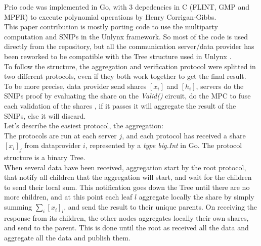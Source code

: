 \documentclass{article}
\begin{document}
Prio code \cite{priocode} was implemented in Go, with 3 depedencies in C (FLINT, GMP and MPFR) to execute polynomial operations by Henry Corrigan-Gibbs.\\
This paper contribution is mostly porting code to use the multiparty computation and SNIPs in the Unlynx framework. So most of the code is used directly from the repository, but all the communication server/data provider has been reworked to be compatible with the Tree structure used in Unlynx \cite{unlynxcode}.\\
To follow the structure, the aggregation and verification protocol were splitted in two different protocols, even if they both work together to get the final result.\\
To be more precise, data provider send shares $[x_i]$ and $[h_i]$, servers do the SNIPs proof by evaluating the share on the \textit{Valid()} circuit, do the MPC to fuse each validation of the shares , if it passes it will aggregate the result of the SNIPs, else it will discard.\\
Let's describe the easiest protocol, the aggregation:\\
The protocols are run at each server $j$, and each protocol has received a share $[x_i]_j$ from dataprovider $i$, represented by a \textit{type big.Int} in Go. The protocol structure is a binary Tree.\\

When several data have been received, aggregation start by the root protocol, that notify all children that the aggregation will start, and wait for the children to send their local sum. This notification goes down the Tree until there are no more children, and at this point each leaf $l$ aggregate locally the share by simply summing $\sum_{i}[x_i]_l$, and send the result to their unique parents. On receiving the response from its children, the other nodes aggregates locally their own shares, and send to the parent. This is done until the root as received all the data and aggregate all the data and publish them.\\
\end{document}
